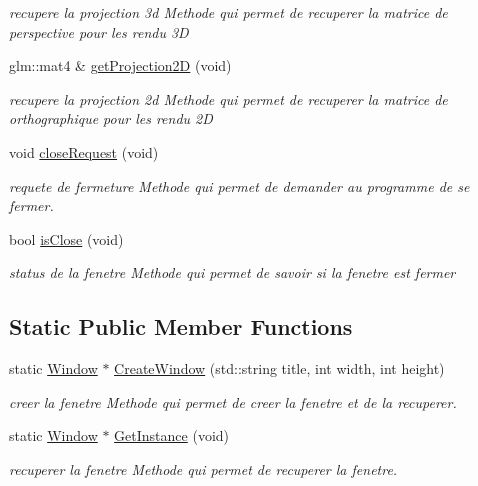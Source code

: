 \begin{DoxyCompactItemize}
\begin{DoxyCompactList}\small\item\em recupere la projection 3d Methode qui permet de recuperer la matrice de perspective pour les rendu 3D \end{DoxyCompactList}\item 
glm\+::mat4 \& \mbox{\hyperlink{class_beer_engine_1_1_window_a69da83af4143505f1e2c14649a854bd5}{get\+Projection2D}} (void)
\begin{DoxyCompactList}\small\item\em recupere la projection 2d Methode qui permet de recuperer la matrice de orthographique pour les rendu 2D \end{DoxyCompactList}\item 
void \mbox{\hyperlink{class_beer_engine_1_1_window_a0ff67069f460adb018b1050da62d8a54}{close\+Request}} (void)
\begin{DoxyCompactList}\small\item\em requete de fermeture Methode qui permet de demander au programme de se fermer. \end{DoxyCompactList}\item 
bool \mbox{\hyperlink{class_beer_engine_1_1_window_a5b29d76b11e9f7457a92e6465939b71d}{is\+Close}} (void)
\begin{DoxyCompactList}\small\item\em status de la fenetre Methode qui permet de savoir si la fenetre est fermer \end{DoxyCompactList}\end{DoxyCompactItemize}
\subsection*{Static Public Member Functions}
\begin{DoxyCompactItemize}
\item 
static \mbox{\hyperlink{class_beer_engine_1_1_window}{Window}} $\ast$ \mbox{\hyperlink{class_beer_engine_1_1_window_a630b8f5eca39a184818b876b1eb0374d}{Create\+Window}} (std\+::string title, int width, int height)
\begin{DoxyCompactList}\small\item\em creer la fenetre Methode qui permet de creer la fenetre et de la recuperer. \end{DoxyCompactList}\item 
static \mbox{\hyperlink{class_beer_engine_1_1_window}{Window}} $\ast$ \mbox{\hyperlink{class_beer_engine_1_1_window_a9a73331ffd93866e83e766540e3891fb}{Get\+Instance}} (void)
\begin{DoxyCompactList}\small\item\em recuperer la fenetre Methode qui permet de recuperer la fenetre. \end{DoxyCompactList}\end{DoxyCompactItemize}


